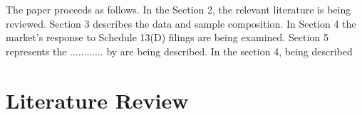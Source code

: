 \documentclass[12pt]{article}
\begin{document}
The paper proceeds as follows. In the Section 2, the relevant literature is being reviewed. Section 3 describes the data and sample composition. In Section 4 the market's response to Schedule 13(D) filings are being examined. Section 5 represents the ............
by  are being described.  In the section 4, being described 

\section{Literature Review}
\end{document}
